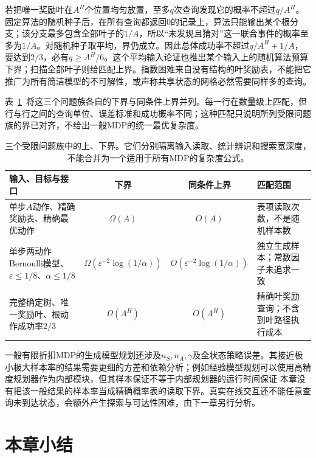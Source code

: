 若把唯一奖励叶在$A^H$个位置均匀放置，至多$q$次查询发现它的概率不超过$q/A^H$。固定算法的随机种子后，在所有查询都返回0的记录上，算法只能输出某个根分支；该分支最多包含全部叶子的$1/A$，所以“未发现且猜对”这一联合事件的概率至多为$1/A$。对随机种子取平均，界仍成立。因此总体成功率不超过$q/A^H+1/A$，要达到$2/3$，必有$q\geq A^H/6$。这个平均输入论证也推出某个输入上的随机算法预算下界；扫描全部叶子则给匹配上界。指数困难来自没有结构的叶奖励表，不能把它推广为所有简洁模型的不可解性，或声称共享状态的网格必然需要同样多的查询。

表~\ref{tab:rl-planning-bounds}~将这三个问题族各自的下界与同条件上界并列。每一行在数量级上匹配，但行与行之间的查询单位、误差标准和成功概率不同；这种匹配只说明所列受限问题族的界已对齐，不给出一般MDP的统一最优复杂度。

\begin{table}[htbp]
 \centering
 \small
 \begin{tabularx}{\linewidth}{@{}>{\raggedright\arraybackslash}Xcc>{\raggedright\arraybackslash}X@{}}
  \toprule
  输入、目标与接口 & 下界 & 同条件上界 & 匹配范围\\
  \midrule
  单步$A$动作、精确奖励表、精确最优动作 & $\Omega(A)$ & $O(A)$ & 表项读取次数，不是随机样本数\\
  单步两动作Bernoulli模型、$\varepsilon\leq1/8$、$\alpha\leq1/8$ & $\Omega(\varepsilon^{-2}\log(1/\alpha))$ & $O(\varepsilon^{-2}\log(1/\alpha))$ & 独立生成样本；常数因子未追求一致\\
  完整确定树、唯一奖励叶、根动作成功率$2/3$ & $\Omega(A^H)$ & $O(A^H)$ & 精确叶奖励查询；不含到叶路径执行成本\\
  \bottomrule
 \end{tabularx}
 \caption{三个受限问题族中的上、下界。它们分别隔离输入读取、统计辨识和搜索宽深度，不能合并为一个适用于所有MDP的复杂度公式。}
 \label{tab:rl-planning-bounds}
\end{table}

一般有限折扣MDP的生成模型规划还涉及$n_S,n_A,\gamma$及全状态策略误差。其接近极小极大样本率的结果需要更细的方差和依赖分析；例如经验模型规划可以使用高精度规划器作为内部模块，但其样本保证不等于内部规划器的运行时间保证
本章没有把该一般结果的样本率当成精确概率表的读取下界。真实在线交互还不能任意查询未到达状态，会额外产生探索与可达性困难，由下一章另行分析。

\section{本章小结}
\label{sec:rl-planning-summary}

